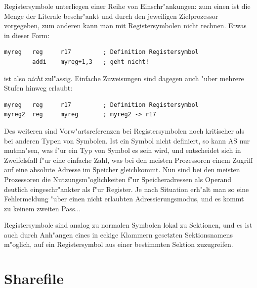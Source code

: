 \documentclass[12pt,a4paper,twoside]{report}
\makeatletter
\newcommand{\ttindex}[1]{\index{#1@{\tt #1}}}
\newcommand{\asname}{AS}
\makeatother
\begin{document}
Registersymbole unterliegen einer Reihe von Einschr"ankungen: zum einen ist die
Menge der Literale beschr"ankt und durch den jeweiligen Zielprozessor vorgegeben,
zum anderen kann man mit Registersymbolen nicht rechnen.  Etwas in dieser Form:
\begin{verbatim}
myreg   reg     r17         ; Definition Registersymbol
        addi    myreg+1,3   ; geht nicht!
\end{verbatim}
ist also {\em nicht} zul"assig.  Einfache Zuweisungen sind dagegen auch "uber mehrere
Stufen hinweg erlaubt:
\begin{verbatim}
myreg   reg     r17         ; Definition Registersymbol
myreg2  reg     myreg       ; myreg2 -> r17
\end{verbatim}
Des weiteren sind Vorw"artsreferenzen bei Registersymbolen noch kritischer als
bei anderen Typen von Symbolen.  Ist ein Symbol nicht definiert, so kann \asname{} nur
mutma"sen, was f"ur ein Typ von Symbol es sein wird, und entscheidet sich in
Zweifelsfall f"ur eine einfache Zahl, was bei den meisten Prozessoren einem Zugriff
auf eine absolute Adresse im Speicher gleichkommt.  Nun sind bei den meisten
Prozessoren die Nutzungsm"oglichkeiten f"ur Speicheradressen als Operand deutlich
eingeschr"ankter als f"ur Register.  Je nach Situation erh"alt man so eine
Fehlermeldung "uber einen nicht erlaubten Adressierungsmodus, und es kommt zu keinem
zweiten Pass...

Registersymbole sind analog zu normalen Symbolen lokal zu Sektionen,
und es ist auch durch Anh"angen eines in eckige Klammern gesetzten Sektionsnamens
m"oglich, auf ein Registersymbol aus einer bestimmten Sektion zuzugreifen.


\section{Sharefile}
\label{ChapShareMain} \ttindex{SHARED}
\end{document}
